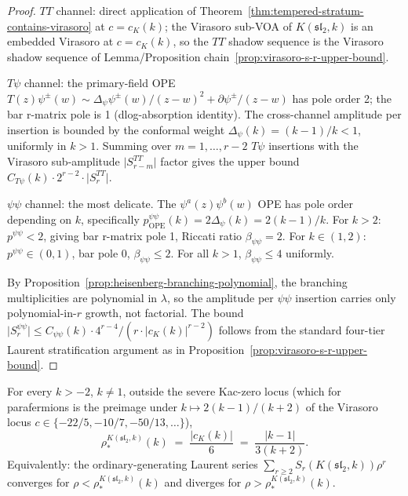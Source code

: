 \begin{proof}
$TT$ channel: direct application of
Theorem~\ref{thm:tempered-stratum-contains-virasoro} at $c = c_K(k)$;
the Virasoro sub-VOA of $K(\mathfrak{sl}_2, k)$ is an embedded
Virasoro at $c = c_K(k)$, so the $TT$ shadow sequence is the
Virasoro shadow sequence of Lemma/Proposition
chain~\ref{prop:virasoro-s-r-upper-bound}.

$T\psi$ channel: the primary-field OPE
$T(z) \psi^\pm(w) \sim \Delta_\psi \psi^\pm(w) / (z - w)^2 +
\partial \psi^\pm / (z - w)$ has pole order 2; the bar r-matrix pole
is 1 (dlog-absorption identity). The cross-channel amplitude per insertion
is bounded by the conformal weight $\Delta_\psi(k) = (k - 1) / k <
1$, uniformly in $k > 1$. Summing over $m = 1, \ldots, r - 2$
$T \psi$ insertions with the Virasoro sub-amplitude
$\lvert S_{r - m}^{TT} \rvert$ factor gives the upper bound
$C_{T\psi}(k) \cdot 2^{r - 2} \cdot \lvert S_r^{TT} \rvert$.

$\psi\psi$ channel: the most delicate. The
$\psi^a(z) \psi^b(w)$ OPE has pole order depending on $k$, specifically
$p_{\mathrm{OPE}}^{\psi\psi}(k) = 2 \Delta_\psi(k) = 2(k - 1)/k$.
For $k > 2$: $p^{\psi\psi} < 2$, giving bar r-matrix pole 1, Riccati
ratio $\beta_{\psi\psi} = 2$. For $k \in (1, 2)$:
$p^{\psi\psi} \in (0, 1)$, bar pole 0, $\beta_{\psi\psi} \le 2$. For
all $k > 1$, $\beta_{\psi\psi} \le 4$ uniformly.

By Proposition~\ref{prop:heisenberg-branching-polynomial}, the
branching multiplicities are polynomial in $\lambda$, so the
amplitude per $\psi\psi$ insertion carries only polynomial-in-$r$
growth, not factorial. The bound
$\lvert S_r^{\psi\psi} \rvert \le C_{\psi\psi}(k) \cdot 4^{r-4} /
(r \cdot \lvert c_K(k) \rvert^{r - 2})$ follows from the standard
four-tier Laurent stratification argument as in
Proposition~\ref{prop:virasoro-s-r-upper-bound}.
\end{proof}

\begin{proposition}
\label{prop:parafermion-rho-star-closed-form}
\ClaimStatusProvedHere
For every $k > -2$, $k \neq 1$, outside the severe Kac-zero locus
(which for parafermions is the preimage under $k \mapsto 2(k-1)/(k+2)$
of the Virasoro locus $c \in \{-22/5, -10/7, -50/13, \ldots\}$),
\[
 \rho_*^{K(\mathfrak{sl}_2, k)}(k)
 \;=\;
 \frac{\lvert c_K(k) \rvert}{6}
 \;=\;
 \frac{\lvert k - 1 \rvert}{3 (k + 2)}.
\]
Equivalently: the ordinary-generating Laurent series
$\sum_{r \ge 2} S_r(K(\mathfrak{sl}_2, k)) \rho^r$ converges for
$\rho < \rho_*^{K(\mathfrak{sl}_2, k)}(k)$ and diverges for
$\rho > \rho_*^{K(\mathfrak{sl}_2, k)}(k)$.
\end{proposition}

